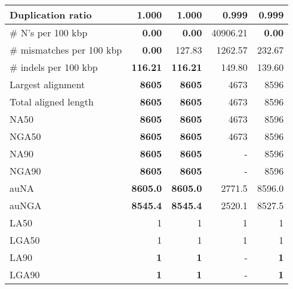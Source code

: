 \documentclass[12pt,a4paper]{article}
\begin{document}
\begin{table}[ht]
\begin{center}
\begin{tabular}{|l*{4}{|r}|}
Duplication ratio & 1.000 & 1.000 & {\bf 0.999} & {\bf 0.999} \\ \hline
\# N's per 100 kbp & {\bf 0.00} & {\bf 0.00} & 40906.21 & {\bf 0.00} \\ \hline
\# mismatches per 100 kbp & {\bf 0.00} & 127.83 & 1262.57 & 232.67 \\ \hline
\# indels per 100 kbp & {\bf 116.21} & {\bf 116.21} & 149.80 & 139.60 \\ \hline
Largest alignment & {\bf 8605} & {\bf 8605} & 4673 & 8596 \\ \hline
Total aligned length & {\bf 8605} & {\bf 8605} & 4673 & 8596 \\ \hline
NA50 & {\bf 8605} & {\bf 8605} & 4673 & 8596 \\ \hline
NGA50 & {\bf 8605} & {\bf 8605} & 4673 & 8596 \\ \hline
NA90 & {\bf 8605} & {\bf 8605} & - & 8596 \\ \hline
NGA90 & {\bf 8605} & {\bf 8605} & - & 8596 \\ \hline
auNA & {\bf 8605.0} & {\bf 8605.0} & 2771.5 & 8596.0 \\ \hline
auNGA & {\bf 8545.4} & {\bf 8545.4} & 2520.1 & 8527.5 \\ \hline
LA50 & 1 & 1 & 1 & 1 \\ \hline
LGA50 & 1 & 1 & 1 & 1 \\ \hline
LA90 & {\bf 1} & {\bf 1} & - & {\bf 1} \\ \hline
LGA90 & {\bf 1} & {\bf 1} & - & {\bf 1} \\ \hline
\end{tabular}
\end{center}
\end{table}
\end{document}
